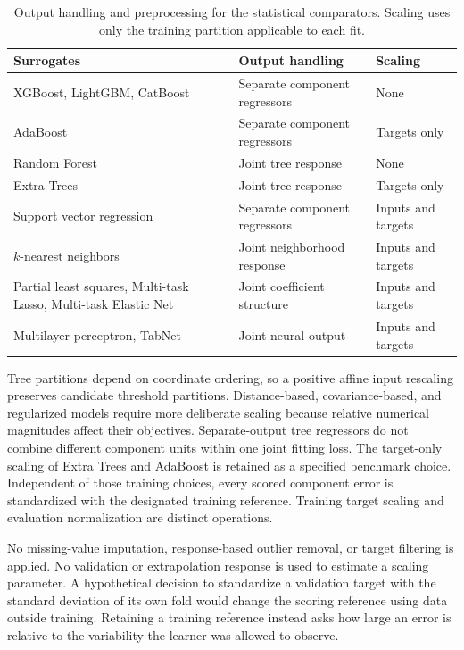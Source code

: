 \begin{table}[htbp]
\centering
\caption{Output handling and preprocessing for the statistical comparators. Scaling uses only the training partition applicable to each fit.}
\label{tab:surrogate_preprocessing}
\small
\begin{tabular}{p{5.1cm}p{3.2cm}p{3.3cm}}
\toprule
Surrogates & Output handling & Scaling\\
\midrule
XGBoost, LightGBM, CatBoost & Separate component regressors & None\\
AdaBoost & Separate component regressors & Targets only\\
Random Forest & Joint tree response & None\\
Extra Trees & Joint tree response & Targets only\\
Support vector regression & Separate component regressors & Inputs and targets\\
$k$-nearest neighbors & Joint neighborhood response & Inputs and targets\\
Partial least squares, Multi-task Lasso, Multi-task Elastic Net & Joint coefficient structure & Inputs and targets\\
Multilayer perceptron, TabNet & Joint neural output & Inputs and targets\\
\bottomrule
\end{tabular}
\end{table}

Tree partitions depend on coordinate ordering, so a positive affine input rescaling preserves candidate threshold partitions. Distance-based, covariance-based, and regularized models require more deliberate scaling because relative numerical magnitudes affect their objectives. Separate-output tree regressors do not combine different component units within one joint fitting loss. The target-only scaling of Extra Trees and AdaBoost is retained as a specified benchmark choice. Independent of those training choices, every scored component error is standardized with the designated training reference. Training target scaling and evaluation normalization are distinct operations.

No missing-value imputation, response-based outlier removal, or target filtering is applied. No validation or extrapolation response is used to estimate a scaling parameter. A hypothetical decision to standardize a validation target with the standard deviation of its own fold would change the scoring reference using data outside training. Retaining a training reference instead asks how large an error is relative to the variability the learner was allowed to observe.

